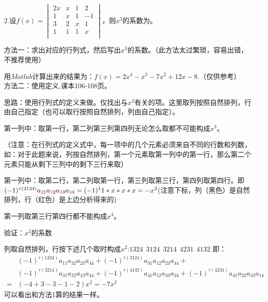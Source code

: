 \documentclass{article}
\begin{document}
2.设$f(x)=
\begin{vmatrix}
  2x & x & 1 & 2\\
  1 & x & 1 & -1\\
  3 & 2 & x & 1\\
  1 & 1 & 1 & x\\
\end{vmatrix}
$，则$x^{3}$的系数为\underline{\hphantom{~~~~~~~~~~}}。

\begin{jie}
方法一：求出对应的行列式，然后写出$x^3$的系数。（此方法太过繁琐，容易出错，不推荐使用）

用$Matlab$计算出来的结果为：$f(x)=2x^4-x^3-7x^2+12x-8$.（仅供参考）
\\

方法二：使用定义,课本106-108页。

思路：使用行列式的定义来做。仅找出与$x^{3}$有关的项。这里取列按照自然排列，行由自己指定（也可以取行按照自然排列，列由自己指定）。

第一列中：取第一行，第二列第三列第四列无论怎么取都不可能构成$x^{3}$。

\textcolor[rgb]{1.00,0.00,0.00}{（注意：在行列式的定义式中，每一项中的几个元素必须来自不同的行数和列数，如：对于此题来说，列按自然排列，第一个元素取第一列中的第一行，那么第二个元素只能从剩下三列中的剩下三行来取）}

第一列中：取第二行，第二列取第一行，第三列取第三行，第四列取第四行。即$(-1)^{\tau(2134)}a_{\textcolor[rgb]{1.00,0.00,0.00}{2}\textcolor[rgb]{0.00,0.00,0.00}{1}}a_{\textcolor[rgb]{1.00,0.00,0.00}{1}\textcolor[rgb]{0.00,0.00,0.00}{2}}a_{\textcolor[rgb]{1.00,0.00,0.00}{3}\textcolor[rgb]{0.00,0.00,0.00}{3}}a_{\textcolor[rgb]{1.00,0.00,0.00}{4}\textcolor[rgb]{0.00,0.00,0.00}{4}}=(-1)^{1}1*x*x*x=-x^{3}$(注意下标，列（黑色）是自然排列，行（红色）是上边分析得来的)

第一列取第三行第四行都不能构成$x^{3}$。

\textcolor[rgb]{0.50,0.00,0.00}{
验证：$x^{2}$的系数
}

列取自然排列，行按下述几个取时构成$x^2$:$1324~~3124~~3214~~4231~~4132$
即：
\begin{align*}
&(-1)^{\tau(1324)}a_{11}a_{32}a_{23}a_{44}+(-1)^{\tau(3124)}a_{31}a_{12}a_{23}a_{44}+\\
&(-1)^{\tau(3214)}a_{31}a_{22}a_{13}a_{44}+(-1)^{\tau(4132)}a_{41}a_{12}a_{33}a_{24}+(-1)^{\tau(4231)}a_{41}a_{22}a_{33}a_{14}\\
=&(-4+3-3-1-2)x^2=-7x^2
\end{align*}
可以看出和方法1算的结果一样。
\end{jie}
\end{document}
